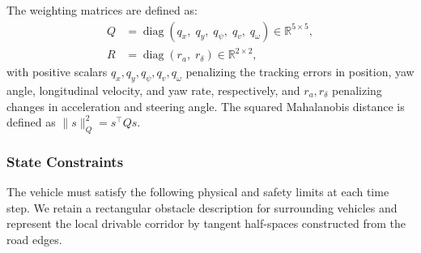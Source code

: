 \documentclass[pdflatex,sn-mathphys,Numbered]{sn-jnl}
\numberwithin{equation}{section}
\begin{document}
	The weighting matrices are defined as:	
	\begin{equation}
		\begin{aligned}
			Q &= \operatorname{diag}(q_x,\; q_y,\; q_\psi,\; q_v,\; q_\omega) \in \mathbb{R}^{5 \times 5},\\
			R &= \operatorname{diag}(r_a,\; r_\delta) \in \mathbb{R}^{2 \times 2},
		\end{aligned}
		\label{equ:sec2_weight_matrices}
	\end{equation}
	with positive scalars \(q_x, q_y, q_\psi, q_v, q_\omega\) penalizing the tracking errors in position, yaw angle, longitudinal velocity, and yaw rate, respectively, and \(r_a, r_\delta\) penalizing changes in acceleration and steering angle. The squared Mahalanobis distance is defined as \(\|s\|_Q^2 = s^\top Q s\).
	
	\subsubsection{State Constraints}
	
	The vehicle must satisfy the following physical and safety limits at each time step. We retain a rectangular obstacle description for surrounding vehicles and represent the local drivable corridor by tangent half-spaces constructed from the road edges.
	
\end{document}
